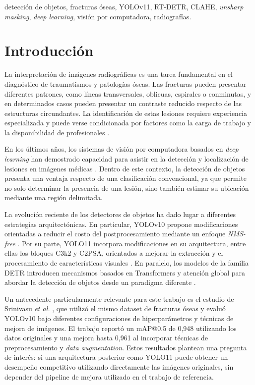 \documentclass[conference]{IEEEtran}
\begin{document}
\begin{IEEEkeywords}
detección de objetos, fracturas óseas, YOLOv11, RT-DETR, CLAHE,
\textit{unsharp masking}, \textit{deep learning}, visión por computadora,
radiografías.
\end{IEEEkeywords}



\section{Introducción}

La interpretación de imágenes radiográficas es una tarea fundamental en el diagnóstico de traumatismos y patologías óseas. Las fracturas pueden presentar diferentes patrones, como líneas transversales, oblicuas, espirales o conminutas, y en determinados casos pueden presentar un contraste reducido respecto de las estructuras circundantes. La identificación de estas lesiones requiere experiencia especializada y puede verse condicionada por factores como la carga de trabajo y la disponibilidad de profesionales \cite{b1_srini}.

En los últimos años, los sistemas de visión por computadora basados en \textit{deep learning} han demostrado capacidad para asistir en la detección y localización de lesiones en imágenes médicas \cite{b2_su,b2_zebada}. Dentro de este contexto, la detección de objetos presenta una ventaja respecto de una clasificación convencional, ya que permite no solo determinar la presencia de una lesión, sino también estimar su ubicación mediante una región delimitada.

La evolución reciente de los detectores de objetos ha dado lugar a diferentes estrategias arquitectónicas. En particular, YOLOv10 propone modificaciones orientadas a reducir el costo del postprocesamiento mediante un enfoque \textit{NMS-free} \cite{b3_srinivasu}. Por su parte, YOLO11 incorpora modificaciones en su arquitectura, entre ellas los bloques C3k2 y C2PSA, orientados a mejorar la extracción y el procesamiento de características visuales \cite{b4_khan}. En paralelo, los modelos de la familia DETR introducen mecanismos basados en Transformers y atención global para abordar la detección de objetos desde un paradigma diferente \cite{b7_leng}.

Un antecedente particularmente relevante para este trabajo es el estudio de Srinivasu \textit{et al.} \cite{b3_srinivasu}, que utilizó el mismo dataset de fracturas óseas y evaluó YOLOv10 bajo diferentes configuraciones de hiperparámetros y técnicas de mejora de imágenes. El trabajo reportó un mAP@0.5 de 0,948 utilizando los datos originales y una mejora hasta 0,961 al incorporar técnicas de preprocesamiento y \textit{data augmentation}. Estos resultados plantean una pregunta de interés: si una arquitectura posterior como YOLO11 puede obtener un desempeño competitivo utilizando directamente las imágenes originales, sin depender del pipeline de mejora utilizado en el trabajo de referencia.
\end{document}
